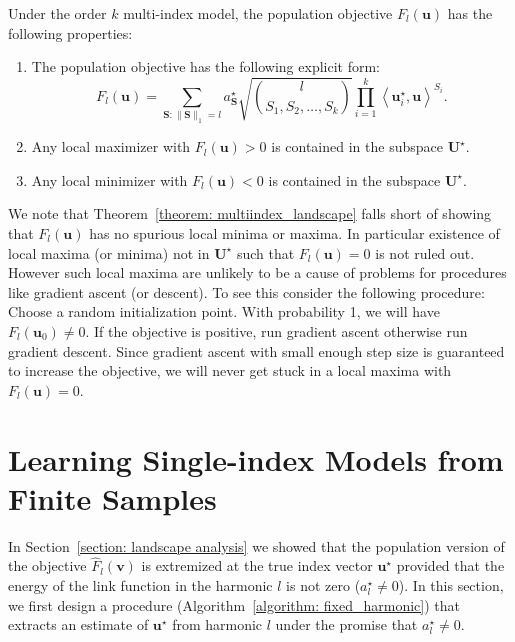 \documentclass[final,12pt]{colt2018} %
\renewcommand\v[1]{{\ensuremath{\boldsymbol{#1}}}}
\newcommand\ip[1]{\left\langle #1 \right\rangle}
\begin{document}
\begin{theorem} Under the order $k$ multi-index model, the population objective $F_l(\v u)$ has the following properties: 
\begin{enumerate}
    \item The population objective has the following explicit form:
    $$F_l(\v u) = \sum_{{\v S}: \|{\v S}\|_1 = l} a_{\v S}^\star \sqrt{\binom{l}{S_1, S_2, \dotsc, S_k}} \prod_{i=1}^k \ip{ \v u^\star_i, \v u}^{S_i}.$$
    \item Any local maximizer with $F_l(\v u) > 0$ is contained in the subspace $\mathcal{\v U}^\star$. 
    \item Any local minimizer with $F_l(\v u) < 0$ is contained in the subspace $\mathcal{\v U}^\star$.
\end{enumerate}
\label{theorem: multiindex_landscape}
\end{theorem}
\begin{remark} We note that Theorem~\ref{theorem: multiindex_landscape} falls short of showing that $F_l(\v u)$ has no spurious local minima or maxima. In particular existence of local maxima (or minima) not in $\mathcal{\v U}^\star$ such that $F_l(\v u) = 0$ is not ruled out. However such local maxima are unlikely to be a cause of problems for procedures like gradient ascent (or descent). To see this consider the following procedure: Choose a random initialization point. With probability 1, we will have $F_l(\v u_0) \neq 0$. If the objective is positive, run gradient ascent otherwise run gradient descent. Since gradient ascent with small enough step size is guaranteed to increase the objective, we will never get stuck in a local maxima with $F_l(\v u) = 0$.   
\end{remark}

\section{Learning Single-index Models from Finite Samples}
\label{section: single_index}

In Section~\ref{section: landscape analysis} we showed that the population version of the objective $\hat{F}_l(\v v)$ is extremized at the true index vector $\v u^\star$ provided that the energy of the link function in the harmonic $l$ is not zero ($a_l^\star \neq 0$). In this section, we first design a procedure (Algorithm~\ref{algorithm: fixed_harmonic}) that extracts an estimate of $\v u^\star$ from harmonic $l$ under the promise that $a_l^\star \neq 0$. 
\end{document}
